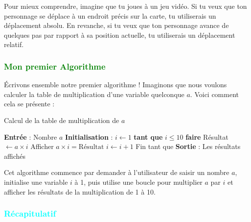 \documentclass{article}
\begin{document}
Pour mieux comprendre, imagine que tu joues à un jeu vidéo. Si tu veux que ton personnage se déplace à un endroit précis sur la carte, tu utiliserais un déplacement absolu. En revanche, si tu veux que ton personnage avance de quelques pas par rapport à sa position actuelle, tu utiliserais un déplacement relatif.

\subsubsection{\textcolor{green}{Mon premier Algorithme}}

Écrivons ensemble notre premier algorithme ! Imaginons que nous voulons calculer la table de multiplication d'une variable quelconque \( a \). Voici comment cela se présente :

\begin{tcolorbox}[colback=brown!10!white, colframe=brown!75!black, title=\textcolor{white}{Mon premier Algorithme}]

\begin{algorithm}[H]
    \caption{Calcul de la table de multiplication de \( a \)}
    \begin{algorithmic}[1]
        \State \textbf{Entrée} : Nombre \( a \)
        \State \textbf{Initialisation} : \( i \gets 1 \)
        \State \textbf{tant que}  \( i \leq 10 \) \textbf{faire} 
            \State Résultat \( \gets a \times i \)
            \State Afficher \( a \times i = \text{Résultat} \)
            \State \( i \gets i + 1 \)
        \State Fin tant que
        \State \textbf{Sortie} : Les résultats affichés
    \end{algorithmic}
\end{algorithm}
\end{tcolorbox}

Cet algorithme commence par demander à l'utilisateur de saisir un nombre \( a \), initialise une variable \( i \) à 1, puis utilise une boucle pour multiplier \( a \) par \( i \) et afficher les résultats de la multiplication de 1 à 10.

 \subsubsection{\textcolor{cyan}{Récapitulatif}}
\end{document}
